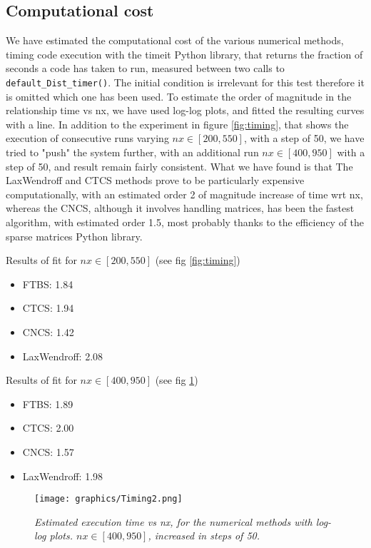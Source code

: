 \subsection{Computational cost}
\label{sec:compcost}
We have estimated the computational cost of the various numerical methods, timing code execution with the timeit Python library, that returns the fraction of seconds a code has taken to run, measured between two calls to \texttt{default\_Dist\_timer()}. The initial condition is irrelevant for this test therefore it is omitted which one has been used.
To estimate the order of magnitude in the relationship time vs nx, we have used log-log plots, and fitted the resulting curves with a line. In addition to the experiment in figure \ref{fig:timing}, that shows the execution of consecutive runs varying $nx\in [200, 550]$, with a step of 50, we have tried to "push" the system further, with an additional run $nx\in [400, 950]$ with a step of 50, and result remain fairly consistent.
What we have found is that The LaxWendroff and CTCS methods prove to be particularly expensive computationally, with an estimated order 2 of magnitude increase of time wrt nx, whereas the CNCS, although it involves handling matrices, has been the fastest algorithm, with estimated order 1.5, most probably thanks to the efficiency of the sparse matrices Python library.

Results of fit for $nx\in [200, 550]$ (see fig \ref{fig:timing})
\begin{itemize}
	\item FTBS: 1.84
	\item CTCS: 1.94
	\item CNCS: 1.42
	\item LaxWendroff: 2.08
\end{itemize}

Results of fit for $nx\in [400, 950]$ (see fig \ref{fig:timing2})
\begin{itemize}
\item FTBS: 1.89
\item CTCS: 2.00
\item CNCS: 1.57
\item LaxWendroff: 1.98
\end{itemize}

\begin{figure}[H]
	\begin{center}
		\texttt{[image: graphics/Timing2.png]}
	\end{center}%
	\caption[computational cost of numerical methods]{ \em Estimated execution time vs nx, for the numerical methods with log-log plots.  $nx\in [400, 950]$, increased in steps of 50.}
	\label{fig:timing2}
\end{figure}

